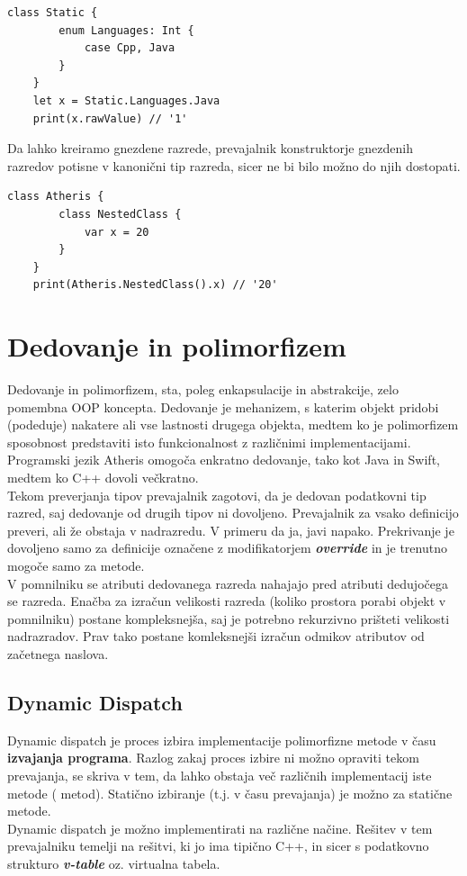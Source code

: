 \documentclass[a4paper, 12pt]{book}
\begin{document}
\begin{lstlisting}[caption={Enumeracija znotraj razreda}, captionpos=b]
	class Static {
	    enum Languages: Int {
	        case Cpp, Java
	    }
	}
	let x = Static.Languages.Java
	print(x.rawValue) // '1'
\end{lstlisting}

Da lahko kreiramo gnezdene razrede, prevajalnik konstruktorje gnezdenih razredov potisne v kanonični tip razreda, sicer ne bi bilo možno do njih dostopati. 

\begin{lstlisting}[caption={Gnezden razred}, captionpos=b]
	class Atheris {
	    class NestedClass {
	        var x = 20
	    }
	}
	print(Atheris.NestedClass().x) // '20'
\end{lstlisting}

\section{Dedovanje in polimorfizem}

Dedovanje in polimorfizem, sta, poleg enkapsulacije in abstrakcije, zelo pomembna OOP koncepta. Dedovanje je mehanizem, s katerim objekt pridobi (podeduje) nakatere ali vse lastnosti drugega objekta, medtem ko je polimorfizem sposobnost predstaviti isto funkcionalnost z različnimi implementacijami. Programski jezik Atheris omogoča enkratno dedovanje, tako kot Java in Swift, medtem ko C++ dovoli večkratno. \\ 
\indent Tekom preverjanja tipov prevajalnik zagotovi, da je dedovan podatkovni tip razred, saj dedovanje od drugih tipov ni dovoljeno. Prevajalnik za vsako definicijo preveri, ali že obstaja v nadrazredu. V primeru da ja, javi napako. Prekrivanje je dovoljeno samo za definicije označene z modifikatorjem \textit{\textbf{override}} in je trenutno mogoče samo za metode. \\
\indent V pomnilniku se atributi dedovanega razreda nahajajo pred atributi dedujočega se razreda. Enačba za izračun velikosti razreda (koliko prostora porabi objekt v pomnilniku) postane kompleksnejša, saj je potrebno rekurzivno prišteti velikosti nadrazradov. Prav tako postane komleksnejši izračun odmikov atributov od začetnega naslova. 

\subsection{Dynamic Dispatch} \label{dynamicDispatch}

Dynamic dispatch je proces izbira implementacije polimorfizne metode v času \textbf{izvajanja programa}. Razlog zakaj proces izbire ni možno opraviti tekom prevajanja, se skriva v tem, da lahko obstaja več različnih implementacij iste metode ( metod). Statično izbiranje (t.j. v času prevajanja) je možno za statične metode. \\
\indent Dynamic dispatch je možno implementirati na različne načine. Rešitev v tem prevajalniku temelji na rešitvi, ki jo ima tipično C++, in sicer s podatkovno strukturo \textit{\textbf{v-table}} oz. virtualna tabela. 
\end{document}
